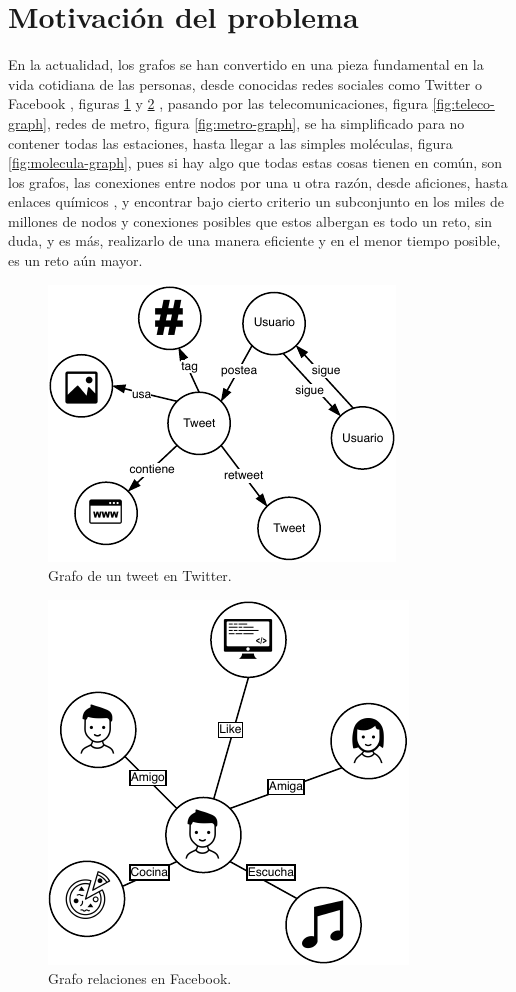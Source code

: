 \section{Motivación del problema}

En la actualidad, los grafos se han convertido en una pieza fundamental en la vida cotidiana de las personas, desde conocidas redes sociales como Twitter o Facebook \cite{api-graph}, figuras \ref{fig:twitter-graph} y \ref{fig:facebook-graph}
 , pasando por las telecomunicaciones, figura \ref{fig:teleco-graph}, redes de metro, figura \ref{fig:metro-graph}, se ha simplificado para no contener todas las estaciones, hasta llegar a las simples moléculas, figura \ref{fig:molecula-graph}, pues si hay algo que todas estas cosas tienen en común, son los grafos, las conexiones entre nodos por una u otra razón, desde aficiones, hasta enlaces químicos \cite{grafo-molecula}, y encontrar bajo cierto criterio un subconjunto en los miles de millones de nodos y conexiones posibles que estos albergan es todo un reto, sin duda, y es más, realizarlo de una manera eficiente y en el menor tiempo posible, es un reto aún mayor.
 
 \begin{figure}[H]
	\centering
	\includegraphics{Figures/twitter-graph.pdf}
	\caption{Grafo de un tweet en Twitter.}
	\label{fig:twitter-graph}
\end{figure}

 \begin{figure}[H]
	\centering
	\includegraphics{Figures/facebook-graph.pdf}
	\caption{Grafo relaciones en Facebook.}
	\label{fig:facebook-graph}
\end{figure}


